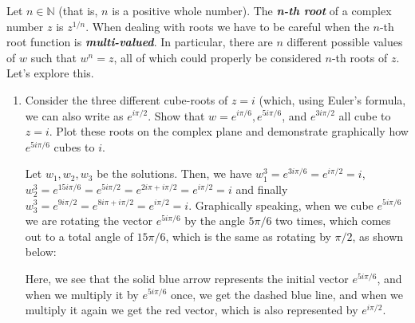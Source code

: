 \documentclass[10pt]{article}
\begin{document}
	Let $n \in \mathbb N$ (that is, $n$ is a positive whole number). The \textbf{\textit{n-th root}} of a complex
	number $z$ is $z^{1/n}$. When dealing with roots we have to be careful when the  $n$-th root function is 
	\textbf{\textit{multi-valued}}. In particular, there are $n$ different possible values of $w$ such that $w^n
	 = z$, all of which could properly be considered $n$-th roots of $z$. Let's explore this. 
	 \begin{enumerate}[label=\alph*),resume]
	 	\item Consider the three different cube-roots of $z = i$ (which, using Euler's formula, we can also 
			write as $e^{i \pi/2}$. Show that $w = e^{i \pi/6}, e^{5i \pi/6}$, and $e^{3i\pi/2}$ all cube to 
			$z = i$. Plot these roots on the complex plane and demonstrate graphically how $e^{5 i \pi/6}$ cubes
			to $i$. 

			\begin{solution}
				Let $w_1, w_2, w_3$ be the solutions. Then, we have $w_1^3 = e^{3i \pi / 6} = e^{i \pi /2} = i$,
				$w_2^3 = e^{15 i \pi / 6} = e^{5 i \pi /2} = e^{2 i \pi + i \pi / 2} = e^{i \pi /2} =i$ and 
				finally $w_3^3 = e^{9 i \pi /2} = e^{8 i \pi + i \pi /2} = e^{i \pi /2} = i$. Graphically
				speaking, when we cube $e^{5i\pi / 6}$ we are rotating the vector $e^{5 i \pi / 6}$ by the 
				angle $5 \pi /6$ two times, which comes out to a total angle of $15 \pi /6$, which is the same
				as rotating by $\pi / 2$, as shown below:
				\begin{center}
				\end{center}
				Here, we see that the solid blue arrow represents the initial vector $e^{5 i \pi /6}$, and when 
				we multiply it by $e^{5 i \pi /6}$ once, we get the dashed blue line, and when we multiply 
				it again we get the red vector, which is also represented by $e^{i \pi /2}$. 


\end{solution}
\end{enumerate}
\end{document}
